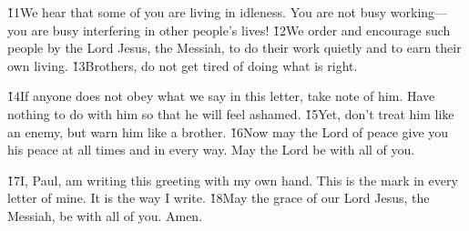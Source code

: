 \v{11}We hear that some of you are living in idleness. You are not busy working---you are busy interfering in other people's lives! \v{12}We order and encourage such people by the Lord Jesus, the Messiah, to do their work quietly and to earn their own living. \v{13}Brothers, do not get tired of doing what is right.

\v{14}If anyone does not obey what we say in this letter, take note of him. Have nothing to do with him so that he will feel ashamed. \v{15}Yet, don't treat him like an enemy, but warn him like a brother. \v{16}Now may the Lord of peace give you his peace at all times and in every way. May the Lord be with all of you.

\v{17}I, Paul, am writing this greeting with my own hand. This is the mark in every letter of mine. It is the way I write. \v{18}May the grace of our Lord Jesus, the Messiah, be with all of you. Amen.
